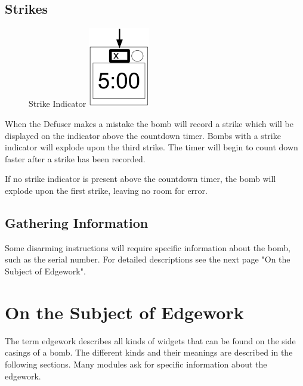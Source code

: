 \documentclass{../../ktane-mod}
\begin{document}
\subsection*{Strikes}
\begin{figure} %
  \vspace{-2\baselineskip}
  Strike Indicator
  \centering
  \includegraphics[height=3.5cm]{images/strike}
  \label{fig:Strikes}
\end{figure}
When the Defuser makes a mistake the bomb will record a strike
which will be displayed on the indicator above the countdown
timer. Bombs with a strike indicator will explode upon the
third strike. The timer will begin to count down faster after
a strike has been recorded.

If no strike indicator is present above the countdown timer,
the bomb will explode upon the first strike, leaving no room
for error.

\subsection*{Gathering Information}
Some disarming instructions will require specific information about the
bomb, such as the serial number. For detailed descriptions see the next
page "On the Subject of Edgework".

\clearpage

\section*{On the Subject of Edgework}\label{sec:on-the-subject-of-edgework}
The term edgework describes all kinds of widgets that can be found on the
side casings of a bomb. The different kinds and their meanings are
described in the following sections. Many modules ask for specific
information about the edgework.
\end{document}
